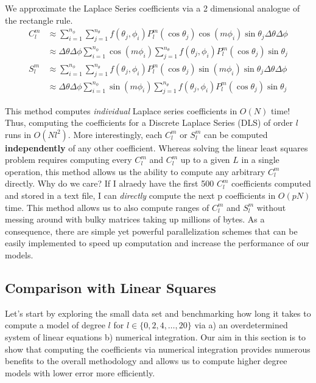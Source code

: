 \documentclass[a4paper]{article}
\theoremstyle{definition}
\begin{document}
    
We approximate the Laplace Series coefficients via a 2 dimensional analogue of the rectangle rule.  
\begin{align*}
    C_l^m &\approx \sum_{i = 1}^{n_\phi}\sum_{j = 1}^{n_\theta} f(\theta_j, \phi_i) P_l^m (\cos \theta_j)\cos (m \phi_i) \sin \theta_j \Delta\theta \Delta\phi\\
          &\approx \Delta\theta \Delta\phi\sum_{i = 1}^{n_\phi}\cos (m \phi_i)\sum_{j = 1}^{n_\theta} f(\theta_j, \phi_i) P_l^m (\cos \theta_j) \sin \theta_j\\
    S_l^m &\approx \sum_{i = 1}^{n_\phi}\sum_{j = 1}^{n_\theta} f(\theta_j, \phi_i) P_l^m (\cos \theta_j)\sin (m \phi_i) \sin \theta_j \Delta\theta \Delta\phi\\
          &\approx \Delta\theta \Delta\phi\sum_{i = 1}^{n_\phi}\sin (m \phi_i)\sum_{j = 1}^{n_\theta} f(\theta_j, \phi_i) P_l^m (\cos \theta_j) \sin \theta_j
\end{align*}

This method computes \textit{individual} Laplace series coefficients in $O(N)$ time! Thus, computing the coefficients for a Discrete Laplace Series (DLS) of order $l$ runs in
$O(Nl^2)$. More interestingly, each $C_l^m$ or $S_l^m$ can be computed \textbf{independently} of any other coefficient. Whereas solving the linear least squares problem requires computing
every $C_l^m$ and $C_l^m$ up to a given $L$ in a single operation, this method allows us the ability to compute any arbitrary $C_l^m$ directly. Why do we care? If I alraedy have the first 500 $C_l^m$ coefficients computed
and stored in a text file, I can \textit{directly} compute the next p coefficients in $O(pN)$ time. This method allows us to also compute ranges of $C_l^m$ and $S_l^m$ without messing around
with bulky matrices taking up millions of bytes. As a consequence, there are simple yet powerful parallelization schemes that can be easily implemented to speed up computation and increase 
the performance of our models.

\subsection{Comparison with Linear Squares}

Let's start by exploring the small data set and benchmarking how long it takes to compute a model of degree $l$ for $l \in \{0, 2, 4, \dots, 20\}$ via 
a) an overdetermined system of linear equations b) numerical integration. Our aim in this section is to show that computing the coefficients via numerical integration
provides numerous benefits to the overall methodology and allows us to compute higher degree models with lower error more efficiently.
\end{document}
